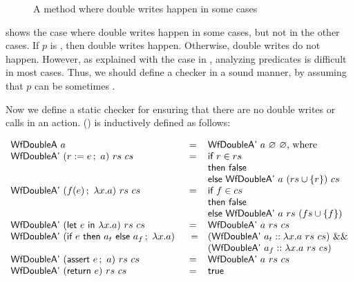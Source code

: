 \begin{figure}[h]
  \caption{A method where double writes happen in some cases}
  \label{ex-maybe-double-writes}
\end{figure}

 shows the case where double writes
happen in some cases, but not in the other cases. If $p$ is \btrue{},
then double writes happen. Otherwise, double writes do not
happen. However, as explained with the case in
, analyzing predicates is difficult in
most cases. Thus, we should define a checker in a sound manner, by
assuming that $p$ can be sometimes \btrue{}.

Now we define a static checker for ensuring that there are no double
writes or calls in an action. () is inductively defined
as follows:

\begin{definition}
  \label{def-wfdoublea}
  \mbox{}
  \begin{center}
    \begin{math}
      \begin{array}{lcl}
        \wfdoublea{a} & = & \wfdoubleap{a}{\emptyset}{\emptyset} \textrm{, where} \\
        \wfdoubleap{(\actwrite{r}{e}{a})}{rs}{cs} & = & \wordif{} r \in rs \\
        & & \wordthen{} \bfalse{} \\
        & & \wordelse{} \wfdoubleap{a}{(\setadd{rs}{r})}{cs} \\
        \wfdoubleap{(\actcall{x}{f}{e}{a})}{rs}{cs} & = & \wordif{} f \in cs \\
        & & \wordthen{} \bfalse{} \\
        & & \wordelse{} \wfdoubleap{a}{rs}{(\setadd{fs}{f})} \\
        \wfdoubleap{(\actlet{e}{x}{a})}{rs}{cs} & = & \wfdoubleap{a}{rs}{cs} \\
        \wfdoubleap{(\actifelse{e}{a_t}{a_f}{x}{a})} & =
        & (\wfdoubleap{\concataction{a_t}{a}}{rs}{cs})\ \band{} \\
        & & (\wfdoubleap{\concataction{a_f}{a}}{rs}{cs}) \\
        \wfdoubleap{(\actassert{e}{a})}{rs}{cs} & = & \wfdoubleap{a}{rs}{cs} \\
        \wfdoubleap{(\actret{e})}{rs}{cs} & = & \btrue{} \\
      \end{array}
    \end{math}
  \end{center}
\end{definition}

